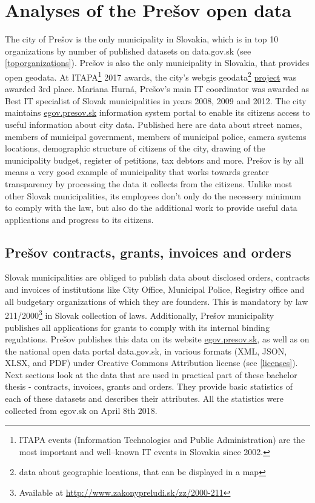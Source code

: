 \documentclass[thesis=B,english]{FITthesis}[2012/06/26]
\begin{document}
	
\chapter{Analyses of the Prešov open data}
\label{presovopendata}
	The city of Prešov is the only municipality in Slovakia, which is in top 10 organizations by number of published datasets on data.gov.sk (see \ref{toporganizations}). Prešov is also the only municipality in Slovakia, that provides open geodata. At ITAPA\footnote{ITAPA events (Information Technologies and Public Administration) are the most important and well–known IT events in Slovakia since 2002.\cite{itapa}} 2017 awards, the city's webgis geodata\footnote{data about geographic locations, that can be displayed in a map} \href{http://webgis.presov.sk/}{project} was awarded 3rd place. Mariana Hurná, Prešov's main IT coordinator was awarded as Best IT specialist of Slovak municipalities in years 2008, 2009 and 2012. The city maintains \href{http://egov.presov.sk}{egov.presov.sk} information system  portal to enable its citizens access to useful information about city data. Published here are data about street names, members of municipal government, members of municipal police, camera systems locations, demographic structure of citizens of the city, drawing of the municipality budget, register of petitions, tax debtors and more. Prešov is by all means a very good example of municipality that works towards greater  transparency by processing the data it collects from the citizens. Unlike most other Slovak municipalities, its employees don't only do the necessery minimum to comply with the law, but also do the additional work to provide useful data applications and progress to its citizens.
	
	\section{Prešov contracts, grants, invoices and orders}
	\label{presovdataattributes}
	Slovak municipalities are obliged to publish data about disclosed orders, contracts and invoices of institutions like City Office, Municipal Police, Registry office and all budgetary organizations of which they are founders. This is mandatory by law 211/2000\footnote{Available at \url{http://www.zakonypreludi.sk/zz/2000-211}} in Slovak collection of laws. Additionally, Prešov municipality  publishes all applications for grants to comply with its internal binding regulations. Prešov publishes this data on its website \url{egov.presov.sk}, as well as on the national open data portal data.gov.sk, in various formats (XML, JSON, XLSX, and PDF) under Creative Commons Attribution license (see \ref{licenses}). Next sections look at the data that are used in practical part of these bachelor thesis - contracts, invoices, grants and orders. They provide basic statistics of each of these datasets and describes their attributes. All the statistics were collected from egov.sk on April 8th 2018.
\end{document}
